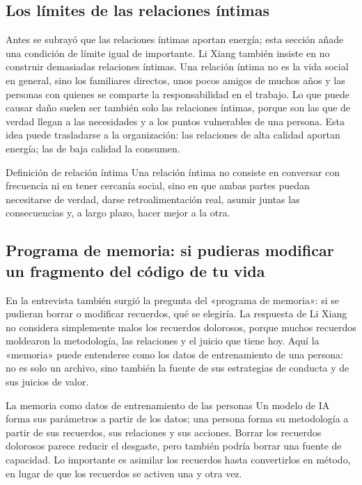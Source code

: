 \documentclass[a4paper]{article}
\begin{document}
\subsection{Los límites de las relaciones íntimas}

Antes se subrayó que las relaciones íntimas aportan energía; esta sección añade una condición de límite igual de importante. Li Xiang también insiste en no construir demasiadas relaciones íntimas. Una relación íntima no es la vida social en general, sino los familiares directos, unos pocos amigos de muchos años y las personas con quienes se comparte la responsabilidad en el trabajo. Lo que puede causar daño suelen ser también solo las relaciones íntimas, porque son las que de verdad llegan a las necesidades y a los puntos vulnerables de una persona. Esta idea puede trasladarse a la organización: las relaciones de alta calidad aportan energía; las de baja calidad la consumen.

\begin{importantbox}{Definición de relación íntima}
Una relación íntima no consiste en conversar con frecuencia ni en tener cercanía social, sino en que ambas partes puedan necesitarse de verdad, darse retroalimentación real, asumir juntas las consecuencias y, a largo plazo, hacer mejor a la otra.
\end{importantbox}

\subsection{Programa de memoria: si pudieras modificar un fragmento del código de tu vida}

En la entrevista también surgió la pregunta del «programa de memoria»: si se pudieran borrar o modificar recuerdos, qué se elegiría. La respuesta de Li Xiang no considera simplemente malos los recuerdos dolorosos, porque muchos recuerdos moldearon la metodología, las relaciones y el juicio que tiene hoy. Aquí la «memoria» puede entenderse como los datos de entrenamiento de una persona: no es solo un archivo, sino también la fuente de sus estrategias de conducta y de sus juicios de valor.

\begin{knowledgebox}{La memoria como datos de entrenamiento de las personas}
Un modelo de IA forma sus parámetros a partir de los datos; una persona forma su metodología a partir de sus recuerdos, sus relaciones y sus acciones. Borrar los recuerdos dolorosos parece reducir el desgaste, pero también podría borrar una fuente de capacidad. Lo importante es asimilar los recuerdos hasta convertirlos en método, en lugar de que los recuerdos se activen una y otra vez.
\end{knowledgebox}
\end{document}
